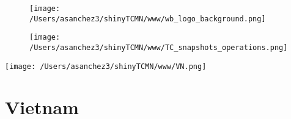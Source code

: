 \documentclass{article}\usepackage[]{graphicx}\usepackage[]{color}
\begin{document}
%

\begin{figure}
  \vspace{-3ex} %
  \hspace{-7ex} %
  \texttt{[image: /Users/asanchez3/shinyTCMN/www/wb\_logo\_background.png]}
\end{figure}
\begin{figure}
  \begin{minipage}[t]{0.99\textwidth} %
      \vspace{-30ex}
      \hspace{-2ex}
      \raggedright{\texttt{[image: /Users/asanchez3/shinyTCMN/www/TC\_snapshots\_operations.png]}}
  \end{minipage}
\end{figure}
%
\begin{minipage}[t]{0.99\textwidth} %
  \vspace{-1.5cm}
  \begin{minipage}[c]{0.36\textwidth} 
    \begin{minipage}[c]{0.28\textwidth} %
      \texttt{[image: /Users/asanchez3/shinyTCMN/www/VN.png]}
    \end{minipage}
    \begin{minipage}[c]{0.70\textwidth} %
      \section*{\color{blue!40!black}Vietnam}
    \end{minipage}
  \end{minipage}
  \begin{minipage}[c]{0.63\textwidth}
  \end{minipage}  
\end{minipage} %
\end{document}
